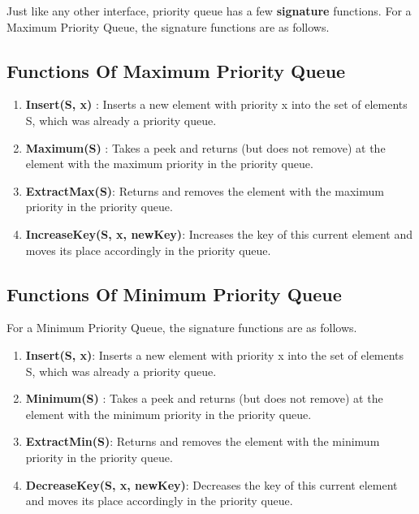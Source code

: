 Just like any other interface, priority queue has a few \textbf{signature} functions.
For a Maximum Priority Queue, the signature functions are as follows.
\subsection{Functions Of Maximum Priority Queue}
\begin{enumerate}
    \item \textbf{Insert(S, x)} : Inserts a new element with priority x into the set of elements S, which was already a priority queue.
    \item \textbf{Maximum(S)} : Takes a peek and returns (but does not remove) at the element with the maximum priority in the priority queue.
    \item \textbf{ExtractMax(S)}: Returns and removes the element with the maximum 
    priority in the priority queue.
    \item \textbf{IncreaseKey(S, x, newKey)}: Increases the key of this current element and moves its place accordingly in the priority queue.
\end{enumerate}

\subsection{Functions Of Minimum Priority Queue}
For a Minimum Priority Queue, the signature functions are as follows.
\begin{enumerate}
    \item \textbf{Insert(S, x)}: Inserts a new element with priority x into the set of elements S, which was already a priority queue.
    \item \textbf{Minimum(S)} : Takes a peek and returns (but does not remove) at the element with the minimum priority in the priority queue.
    \item \textbf{ExtractMin(S)}: Returns and removes the element with the minimum 
    priority in the priority queue.
    \item \textbf{DecreaseKey(S, x, newKey)}: Decreases the key of this current element and moves its place accordingly in the priority queue.
\end{enumerate}
